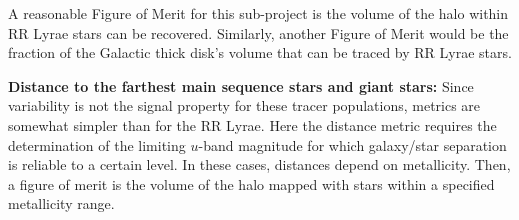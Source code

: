 A reasonable Figure of Merit for this sub-project is the volume of the
halo within RR Lyrae stars  can be recovered. Similarly, another Figure
of Merit would be the fraction of the Galactic thick disk's volume that
can be traced by RR Lyrae stars.

\textbf{Distance to the farthest main sequence stars and giant stars:}
Since variability is not the signal property for these tracer
populations, metrics are somewhat simpler than for the RR Lyrae.
Here the distance metric requires the determination of the limiting $u$-band
magnitude
for which galaxy/star separation is reliable to a certain level. In
these cases, distances depend on metallicity. Then, a figure of merit is
the volume of the halo mapped with stars within a specified metallicity
range.



